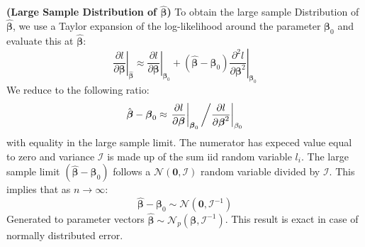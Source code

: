 \begin{remark}{\textbf{(Large Sample Distribution of $\hat{\boldsymbol \beta}$)}}
    To obtain the large sample Distribution of $\hat{\boldsymbol \beta}$, we use a Taylor expansion of the log-likelihood around the parameter $\boldsymbol \beta_0$ and evaluate this at $\hat{\boldsymbol \beta}$:
    \begin{equation*}
        \left.\frac{\partial l}{\partial \boldsymbol \beta}\right|_{\hat{\boldsymbol \beta}} \approx \left.\frac{\partial l}{\partial \boldsymbol \beta}\right|_{\boldsymbol \beta_0} + \left.(\hat{\boldsymbol \beta} - \boldsymbol \beta_0) \frac{\partial^2 l}{\partial\boldsymbol \beta^2}\right|_{\boldsymbol \beta_0}
    \end{equation*}
    We reduce to the following ratio:
    \begin{equation*}
        \hat{\boldsymbol \beta} - \boldsymbol \beta_0 \approx \left.\frac{\partial l}{\partial \boldsymbol \beta}\right|_{\boldsymbol \beta_0} \left/ \frac{\partial l}{\partial \boldsymbol \beta^2} \right|_{\beta_0}
    \end{equation*}
    with equality in the large sample limit. The numerator has expeced value equal to zero and variance $\mathcal{I}$ is made up of the sum iid random variable $l_i$. The large sample limit $(\hat{\boldsymbol \beta} - \boldsymbol \beta_0)$ follows a $\mathcal{N}(\boldsymbol 0, \mathcal{I})$ random variable divided by $\mathcal{I}$. This implies that as $n\rightarrow\infty$:
    \begin{equation*}
        \hat{\boldsymbol \beta} - \boldsymbol \beta_0 \sim \mathcal{N}(\boldsymbol 0, \mathcal{I}^{-1})
    \end{equation*}
    Generated to parameter vectors $\hat{\boldsymbol \beta}\sim\mathcal{N}_p(\boldsymbol \beta, \mathcal{I}^{-1})$. This result is exact in case of normally distributed error. 
\end{remark}

